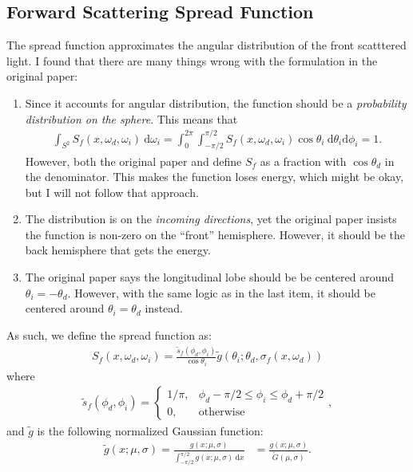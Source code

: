 \documentclass[10pt]{article}
\newcommand{\dee}{\mathrm{d}}
\begin{document}
  \subsection{Forward Scattering Spread Function}
  The spread function approximates the angular distribution of the front scatttered light.  I found that there are many things wrong with the formulation in the original paper:
  \begin{enumerate}
  	\item Since it accounts for angular distribution, the function should be a \emph{probability distribution on the sphere}.  This means that
  	\begin{align*}
  		\int_{S^2} S_f(x,\omega_d, \omega_i)\ \dee\omega_i = \int_{0}^{2\pi} \int_{-\pi/2}^{\pi/2} S_f(x, \omega_d, \omega_i) \cos\theta_i\ \dee\theta_i \dee\phi_i =  1.
  	\end{align*}
  	However, both the original paper and \cite{Sadeghi:2010} define $S_f$ as a fraction with $\cos\theta_d$ in the denominator.  This makes the function loses energy, which might be okay, but I will not follow that approach.

  	\item The distribution is on the \emph{incoming directions}, yet the original paper insists the function is non-zero on the ``front'' hemisphere.  However, it should be the back hemisphere that gets the energy.

  	\item The original paper says the longitudinal lobe should be be centered around $\theta_i = -\theta_d$.  However, with the same logic as in the last item, it should be centered around $\theta_i = \theta_d$ instead.
  \end{enumerate}
  As such, we define the spread function as:
  \begin{align*}
  	S_f(x,\omega_d, \omega_i) = \frac{\tilde{s}_f(\phi_d, \phi_i)}{\cos \theta_i} \tilde{g}(\theta_i; \theta_d, \sigma_f(x,\omega_d))
  \end{align*}
  where
  \begin{align*}
  	\tilde{s}_f(\phi_d, \phi_i) = \begin{cases}
  		1/\pi, & \phi_d - \pi/2 \leq \phi_i \leq \phi_d + \pi/2 \\
  		0, & \mathrm{otherwise}
  	\end{cases},
  \end{align*}
  and $\tilde{g}$ is the following normalized Gaussian function:
  \begin{align*}
  	\tilde{g}(x;\mu,\sigma) 
  	= \frac{g(x;\mu,\sigma)}{\int_{-\pi/2}^{\pi/2} g(x;\mu,\sigma)\ \dee x}
  	&= \frac{g(x;\mu,\sigma)}{\tilde{G}(\mu,\sigma)}.
  \end{align*}  
\end{document}
